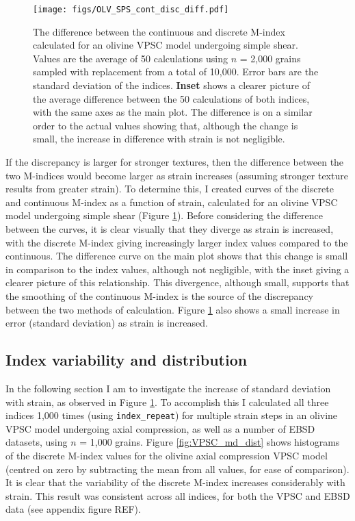 \documentclass[a4paper,12pt]{report}
\numberwithin{equation}{chapter}
\begin{document}
\begin{figure}[h]
  \centering
    \texttt{[image: figs/OLV\_SPS\_cont\_disc\_diff.pdf]}
  \caption[Discrete and continuous M-index difference (olivine VPSC)]{The difference between the continuous and discrete M-index calculated for an olivine VPSC model undergoing simple shear. Values are the average of 50 calculations using $n$ = 2,000 grains sampled with replacement from a total of 10,000. Error bars are the standard deviation of the indices. \textbf{Inset} shows a clearer picture of the average difference between the 50 calculations of both indices, with the same axes as the main plot. The difference is on a similar order to the actual values showing that, although the change is small, the increase in difference with strain is not negligible.}
  \label{fig:OLV_SPS_cont_disc_diff}
\end{figure}  

If the discrepancy is larger for stronger textures, then the difference between the two M-indices would become larger as strain increases (assuming stronger texture results from greater strain). To determine this, I created curves of the discrete and continuous M-index as a function of strain, calculated for an olivine VPSC model undergoing simple shear (Figure \ref{fig:OLV_SPS_cont_disc_diff}). Before considering the difference between the curves, it is clear visually that they diverge as strain is increased, with the discrete M-index giving increasingly larger index values compared to the continuous. The difference curve on the main plot shows that this change is small in comparison to the index values, although not negligible, with the inset giving a clearer picture of this relationship. This divergence, although small, supports that the smoothing of the continuous M-index is the source of the discrepancy between the two methods of calculation. Figure \ref{fig:OLV_SPS_cont_disc_diff} also shows a small increase in error (standard deviation) as strain is increased. 

\subsection{Index variability and distribution}

In the following section I am to investigate the increase of standard deviation with strain, as observed in Figure \ref{fig:OLV_SPS_cont_disc_diff}. To accomplish this I calculated all three indices 1,000 times (using \texttt{index\_repeat}) for multiple strain steps in an olivine VPSC model undergoing axial compression, as well as a number of EBSD datasets, using $n$ = 1,000 grains. Figure \ref{fig:VPSC_md_dist} shows histograms of the discrete M-index values for the olivine axial compression VPSC model (centred on zero by subtracting the mean from all values, for ease of comparison). It is clear that the variability of the discrete M-index increases considerably with strain. This result was consistent across all indices, for both the VPSC and EBSD data (see appendix figure REF).
\end{document}
